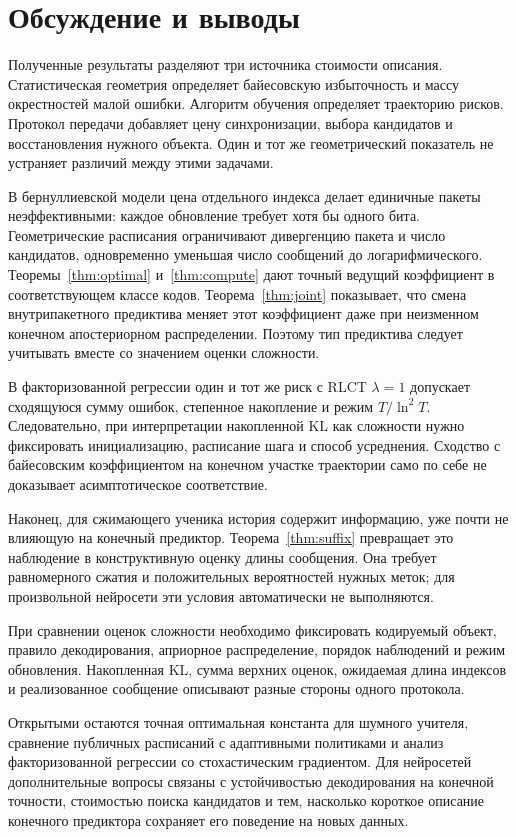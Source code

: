 \section{Обсуждение и выводы}

Полученные результаты разделяют три источника стоимости описания.
Статистическая геометрия определяет байесовскую избыточность и массу
окрестностей малой ошибки. Алгоритм обучения определяет траекторию рисков.
Протокол передачи добавляет цену синхронизации, выбора кандидатов и
восстановления нужного объекта. Один и тот же геометрический показатель
не устраняет различий между этими задачами.

В бернуллиевской модели цена отдельного индекса делает единичные пакеты
неэффективными: каждое обновление требует хотя бы одного бита.
Геометрические расписания ограничивают дивергенцию пакета и число
кандидатов, одновременно уменьшая число сообщений до логарифмического.
Теоремы~\ref{thm:optimal} и~\ref{thm:compute} дают точный ведущий коэффициент
в соответствующем классе кодов. Теорема~\ref{thm:joint} показывает, что
смена внутрипакетного предиктива меняет этот коэффициент даже при
неизменном конечном апостериорном распределении. Поэтому тип предиктива
следует учитывать
вместе со значением оценки сложности.

В факторизованной регрессии один и тот же риск с RLCT $\lambda=1$ допускает
сходящуюся сумму ошибок, степенное накопление и режим $T/\ln^2T$.
Следовательно, при интерпретации накопленной KL как сложности нужно
фиксировать инициализацию, расписание шага и способ усреднения.
Сходство с байесовским коэффициентом на конечном участке траектории само
по себе не доказывает асимптотическое соответствие.

Наконец, для сжимающего ученика история содержит информацию, уже почти не
влияющую на конечный предиктор. Теорема~\ref{thm:suffix} превращает это
наблюдение в конструктивную оценку длины сообщения. Она требует
равномерного сжатия и положительных вероятностей нужных меток; для
произвольной нейросети эти условия автоматически не выполняются.

При сравнении оценок сложности необходимо фиксировать кодируемый объект,
правило декодирования, априорное распределение, порядок наблюдений и режим
обновления. Накопленная KL, сумма верхних оценок, ожидаемая длина индексов
и реализованное сообщение описывают разные стороны одного протокола.

Открытыми остаются точная оптимальная константа для шумного учителя,
сравнение публичных расписаний с адаптивными политиками и анализ
факторизованной регрессии со стохастическим градиентом. Для нейросетей
дополнительные вопросы связаны с устойчивостью декодирования на конечной
точности, стоимостью поиска кандидатов и тем, насколько короткое описание
конечного предиктора сохраняет его поведение на новых данных.
